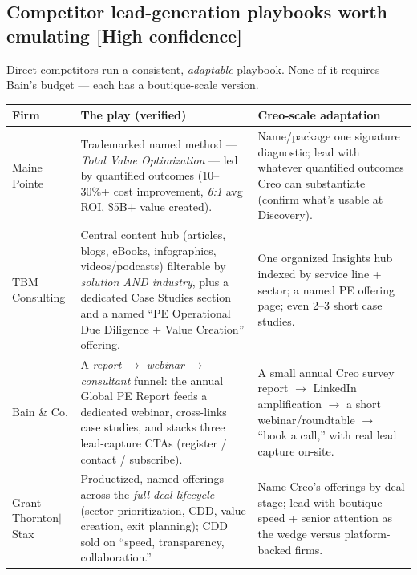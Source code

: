 \documentclass[11pt]{article}
\newcommand{\high}{\textcolor{green!45!black}{\textbf{[High confidence]}}}
\begin{document}
\subsection{Competitor lead-generation playbooks worth emulating \high}
Direct competitors run a consistent, \emph{adaptable} playbook. None of it requires Bain's
budget --- each has a boutique-scale version.

\begin{center}
\renewcommand{\arraystretch}{1.35}
\begin{tabular}{p{2.5cm} p{5.7cm} p{4.6cm}}
\toprule
\textbf{Firm} & \textbf{The play (verified)} & \textbf{Creo-scale adaptation} \\
\midrule
Maine Pointe & Trademarked named method --- \emph{Total Value Optimization\texttrademark{}}
--- led by quantified outcomes (10--30\%+ cost improvement, \emph{6:1} avg ROI, \$5B+ value
created). & Name/package one signature diagnostic; lead with whatever quantified outcomes
Creo can substantiate (confirm what's usable at Discovery). \\
TBM Consulting & Central content hub (articles, blogs, eBooks, infographics,
videos/podcasts) filterable by \emph{solution AND industry}, plus a dedicated Case Studies
section and a named ``PE Operational Due Diligence + Value Creation'' offering. & One
organized Insights hub indexed by service line + sector; a named PE offering page; even
2--3 short case studies. \\
Bain \& Co. & A \emph{report} $\rightarrow$ \emph{webinar} $\rightarrow$ \emph{consultant}
funnel: the annual Global PE Report feeds a dedicated webinar, cross-links case studies,
and stacks three lead-capture CTAs (register / contact / subscribe). & A small annual Creo
survey report $\rightarrow$ LinkedIn amplification $\rightarrow$ a short
webinar/roundtable $\rightarrow$ ``book a call,'' with real lead capture on-site. \\
Grant Thornton$\vert$Stax & Productized, named offerings across the \emph{full deal
lifecycle} (sector prioritization, CDD, value creation, exit planning); CDD sold on
``speed, transparency, collaboration.'' & Name Creo's offerings by deal stage; lead with
boutique speed + senior attention as the wedge versus platform-backed firms. \\
\bottomrule
\end{tabular}
\end{center}
\end{document}
